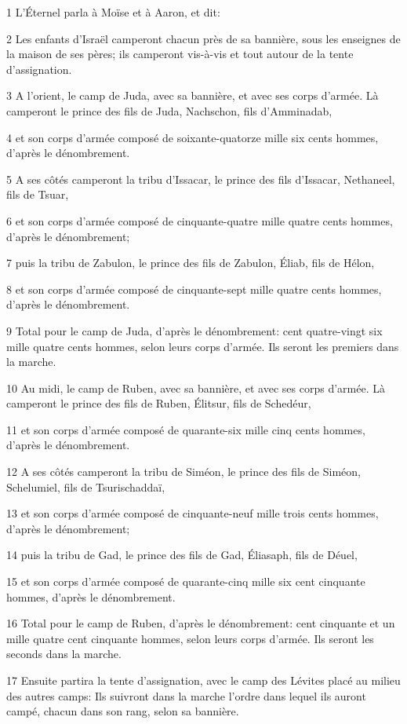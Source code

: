 \par 1 L'Éternel parla à Moïse et à Aaron, et dit:
\par 2 Les enfants d'Israël camperont chacun près de sa bannière, sous les enseignes de la maison de ses pères; ils camperont vis-à-vis et tout autour de la tente d'assignation.
\par 3 A l'orient, le camp de Juda, avec sa bannière, et avec ses corps d'armée. Là camperont le prince des fils de Juda, Nachschon, fils d'Amminadab,
\par 4 et son corps d'armée composé de soixante-quatorze mille six cents hommes, d'après le dénombrement.
\par 5 A ses côtés camperont la tribu d'Issacar, le prince des fils d'Issacar, Nethaneel, fils de Tsuar,
\par 6 et son corps d'armée composé de cinquante-quatre mille quatre cents hommes, d'après le dénombrement;
\par 7 puis la tribu de Zabulon, le prince des fils de Zabulon, Éliab, fils de Hélon,
\par 8 et son corps d'armée composé de cinquante-sept mille quatre cents hommes, d'après le dénombrement.
\par 9 Total pour le camp de Juda, d'après le dénombrement: cent quatre-vingt six mille quatre cents hommes, selon leurs corps d'armée. Ils seront les premiers dans la marche.
\par 10 Au midi, le camp de Ruben, avec sa bannière, et avec ses corps d'armée. Là camperont le prince des fils de Ruben, Élitsur, fils de Schedéur,
\par 11 et son corps d'armée composé de quarante-six mille cinq cents hommes, d'après le dénombrement.
\par 12 A ses côtés camperont la tribu de Siméon, le prince des fils de Siméon, Schelumiel, fils de Tsurischaddaï,
\par 13 et son corps d'armée composé de cinquante-neuf mille trois cents hommes, d'après le dénombrement;
\par 14 puis la tribu de Gad, le prince des fils de Gad, Éliasaph, fils de Déuel,
\par 15 et son corps d'armée composé de quarante-cinq mille six cent cinquante hommes, d'après le dénombrement.
\par 16 Total pour le camp de Ruben, d'après le dénombrement: cent cinquante et un mille quatre cent cinquante hommes, selon leurs corps d'armée. Ils seront les seconds dans la marche.
\par 17 Ensuite partira la tente d'assignation, avec le camp des Lévites placé au milieu des autres camps: Ils suivront dans la marche l'ordre dans lequel ils auront campé, chacun dans son rang, selon sa bannière.
